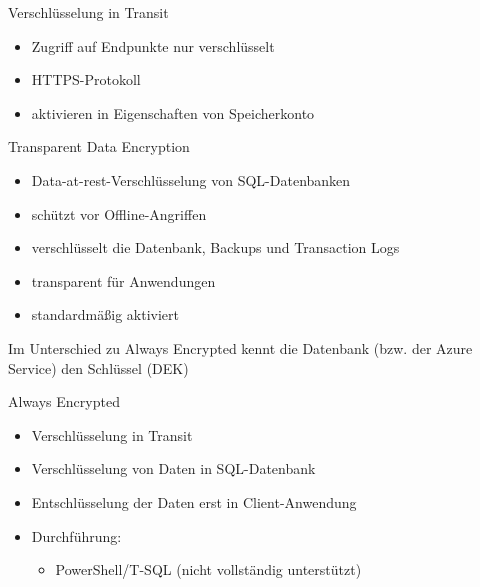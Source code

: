 \begin{flashcard}[Definition]{Verschlüsselung in Transit}
    \begin{itemize}
        \item Zugriff auf Endpunkte nur verschlüsselt
        \item HTTPS-Protokoll
        \item aktivieren in Eigenschaften von Speicherkonto
    \end{itemize}
\end{flashcard}

\begin{flashcard}[Definition]{Transparent Data Encryption}
    \begin{itemize}
        \item Data-at-rest-Verschlüsselung von SQL-Datenbanken
        \item schützt vor Offline-Angriffen
        \item verschlüsselt die Datenbank, Backups und Transaction Logs
        \item[$\Rightarrow$] transparent für Anwendungen
        \item standardmäßig aktiviert
    \end{itemize}
    \vspace{1cm}
    Im Unterschied zu Always Encrypted kennt die Datenbank (bzw. der Azure Service) den Schlüssel (DEK)
\end{flashcard}


\begin{flashcard}[Definition]{Always Encrypted}
    \begin{itemize}
        \item Verschlüsselung in Transit
        \item Verschlüsselung von Daten in SQL-Datenbank
        \item Entschlüsselung der Daten erst in Client-Anwendung
        \item Durchführung:
            \begin{itemize}
                \item PowerShell/T-SQL (nicht vollständig unterstützt)
            \end{itemize}
    \end{itemize}
\end{flashcard}

